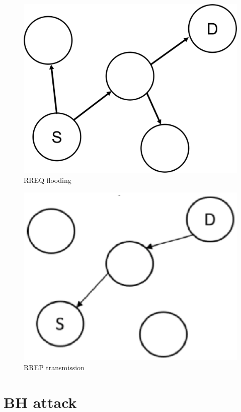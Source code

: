 \documentclass[conference]{IEEEtran}
\begin{document}
\begin{figure}[!htb]
\centering
\includegraphics[scale=.035]{RREQ}
\caption{RREQ flooding}
\label{fig:rreqFlooding}
\end{figure}

\begin{figure}[!htb]
\centering
\includegraphics[scale=.60]{RREP}
\caption{RREP transmission}
\label{fig:rrepTrans}
\end{figure}

\section{BH attack}
\label{bhAttack}
\end{document}
